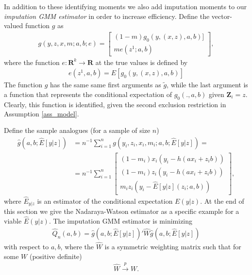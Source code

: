 \documentclass{article}
\theoremstyle{definition}
\theoremstyle{remark}
\begin{document}
In addition to these identifying moments we also add imputation moments to our \emph{imputation GMM estimator} in order to increase efficiency. Define the vector-valued function $g$ as
\begin{align}
    g(y,z,x,m; a,b; e)=\left[\begin{array}{c}
        (1-m) g_0(y, (x,z), a, b)]\\
          m e(z^1; a,b)
    \end{array}\right],
\end{align}
where the function $e: \mathbf{R}^k \rightarrow \mathbf{R}$ at the true values is defined by
\begin{align}
e(z^1,a,b)= E[g_0(y, (x,z), a, b)]
\end{align}
The function $g$ has the same same first arguments as $\tilde{g}$, while the last argument is a function that represents the conditional expectation of $g_0(., a,b)$ given $\mathbf{Z}_i=z$. Clearly, this function is identified, given the second exclusion restriction in Assumption \ref{ass_model}.

Define the sample analogues (for a sample of size $n$)
\begin{align}
    \hat{g}(a,b; \hat{E}[y|z])&=n^{-1}\sum_{i=1}^n g(y_i,z_i,x_i,m_i; a,b; \hat{E}[y|z])= \\
    &=n^{-1}\sum_{i=1}^n\left[\begin{array}{c}
        (1-m_i) x_i(y_i- h(ax_i+z_i b))  \\
        (1-m_i) z_i(y_i- h(ax_i+z_i b)) \\
          m_i z_i(y_i- \hat{E}[y|z](z_i; a,b))
    \end{array}\right], \nonumber %
\end{align}
where $\hat{E}_{y|z}$ is an estimator of the conditional expectation $E(y|z)$. At the end of this section we give the Nadaraya-Watson estimator as a specific example for a viable $\hat{E}(y|z)$. The imputation GMM estimator is minimizing
\begin{align}
    \hat{Q}_n(a,b)= \hat{g}(a,b;\hat{E}[y|z])'\hat{W}\hat{g}(a,b;\hat{E}[y|z])
\end{align}
with respect to $a,b$, where the $\hat{W}$ is a symmetric weighting matrix such that for some $W$ (positive definite)
\begin{align}
    \hat{W} \stackrel{p}{\rightarrow}W.
\end{align}
\end{document}
